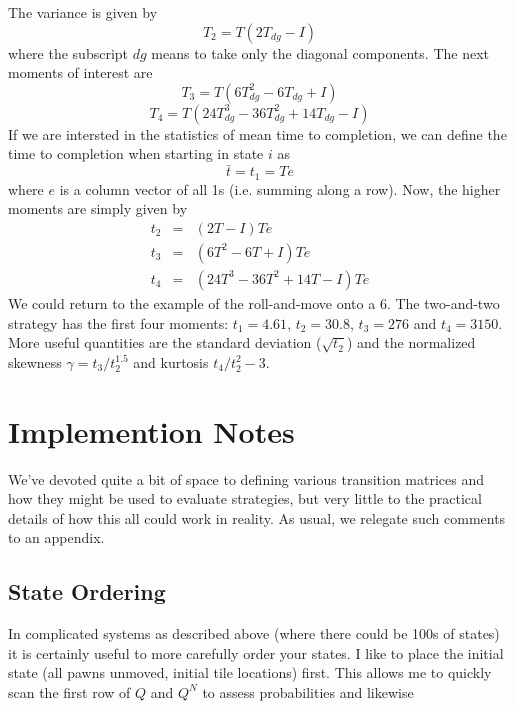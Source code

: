 \documentclass[letterpaper,11pt]{article}
\begin{document}
The variance is given by
\begin{equation}
	T_2 = T(2T_{dg}-I)
\end{equation}
where the subscript $dg$ means to take only the diagonal components.  The next
moments of interest are
\begin{equation}
	T_3 = T(6T_{dg}^2-6T_{dg}+I)
\end{equation}
\begin{equation}
	T_4 = T(24T_{dg}^3-36T_{dg}^2+14T_{dg}-I)
\end{equation}
If we are intersted in the statistics of mean time to completion, we can define
the time to completion when starting in state $i$ as
\[
	\bar{t}=t_1=Te
\]
where $e$ is a column vector of all 1s (i.e. summing along a row).  Now, the
higher moments are simply given by
\[
	\begin{array}{rcl}
		t_2 & = & (2T-I)Te \\
		t_3 & = & (6T^2-6T+I)Te \\
		t_4 & = & (24T^3-36T^2+14T-I)Te
	\end{array}
\]
We could return to the example of the roll-and-move onto a 6.  The two-and-two
strategy has the first four moments: $t_1=4.61$, $t_2=30.8$, $t_3=276$ and
$t_4=3150$.  More useful quantities are the standard deviation ($\sqrt{t_2}$)
and the normalized skewness $\gamma=t_3/t_2^{1.5}$ and kurtosis $t_4/t_2^2-3$.


\appendix
\section{Implemention Notes}
We've devoted quite a bit of space to defining various transition matrices and
how they might be used to evaluate strategies, but very little to the practical
details of how this all could work in reality.  As usual, we relegate such
comments to an appendix.

\subsection{State Ordering}
In complicated systems as described above (where there could be 100s of states)
it is certainly useful to more carefully order your states.  I like to place
the initial state (all pawns unmoved, initial tile locations) first.  This
allows me to quickly scan the first row of $Q$ and $Q^N$ to assess probabilities
and likewise 
\end{document}
